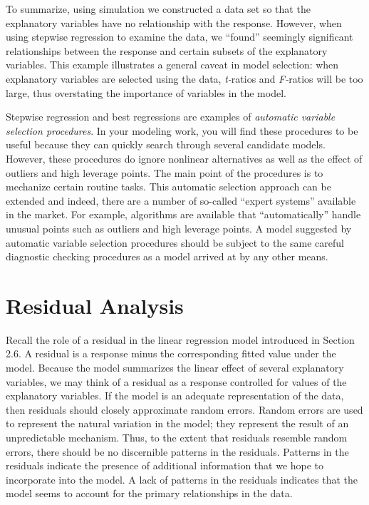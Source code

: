 
To summarize, using simulation we constructed a data set so that the
explanatory variables have no relationship with the response.
However, when using stepwise regression to examine the data, we
``found'' seemingly significant relationships between the response
and certain subsets of the explanatory variables. This example
illustrates a general caveat in model selection: when explanatory
variables are selected using the data, \textit{t-}ratios and
\textit{F-}ratios will be too large, thus overstating the importance
of variables in the model.

\linejed

\newpage


Stepwise regression and best regressions are examples of
\textit{automatic variable selection procedures}. In your modeling
work, you will find these procedures to be useful because they can
quickly search through several candidate models. However, these
procedures do ignore nonlinear alternatives as well as the effect of
outliers and high leverage points. The main point of the procedures
is to mechanize certain routine tasks. This automatic selection
approach can be extended and indeed, there are a number of so-called
``expert systems'' available in the market. For example, algorithms
are available that ``automatically'' handle unusual points such as
outliers and high leverage points. A model suggested by automatic
variable selection procedures should be subject to the same careful
diagnostic checking procedures as a model arrived at by any other
means.

\section{Residual Analysis}\label{S5:ResidualAnalysis}

Recall the role of a residual in the linear regression model
introduced in Section 2.6. A residual is a response minus the
corresponding fitted value under the model. Because the model
summarizes the linear effect of several explanatory variables, we
may think of a residual as a response controlled for values of the
explanatory variables. If the model is an adequate representation of
the data, then residuals should closely approximate random errors.
Random errors are used to represent the natural variation in the
model; they represent the result of an unpredictable mechanism.
Thus, to the extent that residuals resemble random errors, there
should be no discernible patterns in the residuals. Patterns in the
residuals indicate the presence of additional information that we
hope to incorporate into the model. A lack of patterns in the
residuals indicates that the model seems to account for the primary
relationships in the data.

